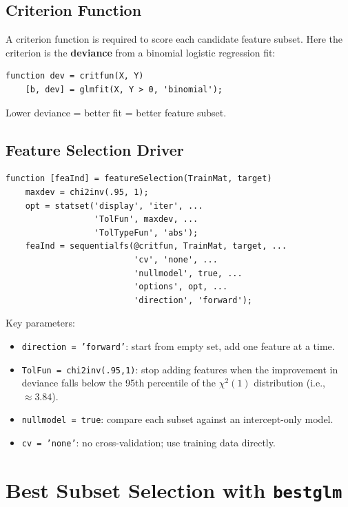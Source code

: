 \documentclass[11pt]{article}
\begin{document}
\subsection{Criterion Function}
A criterion function is required to score each candidate feature
subset. Here the criterion is the \textbf{deviance} from a binomial
logistic regression fit:

\begin{verbatim}
function dev = critfun(X, Y)
    [b, dev] = glmfit(X, Y > 0, 'binomial');
\end{verbatim}

Lower deviance = better fit = better feature subset.

\subsection{Feature Selection Driver}
\begin{verbatim}
function [feaInd] = featureSelection(TrainMat, target)
    maxdev = chi2inv(.95, 1);
    opt = statset('display', 'iter', ...
                  'TolFun', maxdev, ...
                  'TolTypeFun', 'abs');
    feaInd = sequentialfs(@critfun, TrainMat, target, ...
                          'cv', 'none', ...
                          'nullmodel', true, ...
                          'options', opt, ...
                          'direction', 'forward');
\end{verbatim}

Key parameters:
\begin{itemize}
    \item \texttt{direction = 'forward'}: start from empty set, add
      one feature at a time.
    \item \texttt{TolFun = chi2inv(.95,1)}: stop adding features when
      the improvement in deviance falls below the 95th percentile of
      the $\chi^2(1)$ distribution (i.e., $\approx 3.84$).
    \item \texttt{nullmodel = true}: compare each subset against an
      intercept-only model.
    \item \texttt{cv = 'none'}: no cross-validation; use training data
      directly.
\end{itemize}


\newpage
\section{Best Subset Selection with \texttt{bestglm}}
\end{document}
